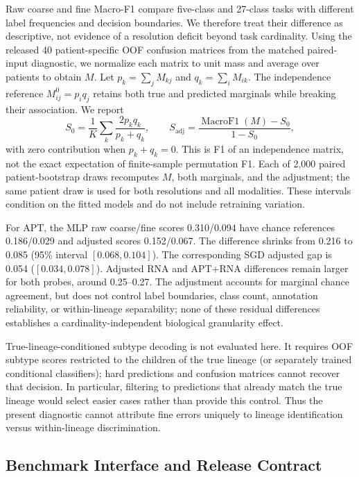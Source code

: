 \documentclass{article} %
\begin{document}
Raw coarse and fine Macro-F1 compare five-class and 27-class tasks with different
label frequencies and decision boundaries. We therefore treat their difference
as descriptive, not evidence of a resolution deficit beyond task cardinality.
Using the released 40 patient-specific OOF confusion matrices from the matched
paired-input diagnostic, we normalize each matrix to unit mass and average
over patients to obtain $M$. Let $p_k=\sum_j M_{kj}$ and
$q_k=\sum_i M_{ik}$. The independence reference $M^0_{ij}=p_iq_j$ retains both
true and predicted marginals while breaking their association. We report
\begin{equation}
S_0=\frac{1}{K}\sum_k\frac{2p_kq_k}{p_k+q_k},\qquad
S_{\mathrm{adj}}=\frac{\operatorname{MacroF1}(M)-S_0}{1-S_0},
\end{equation}
with zero contribution when $p_k+q_k=0$. This is F1 of an independence matrix,
not the exact expectation of finite-sample permutation F1. Each of 2,000 paired
patient-bootstrap draws recomputes $M$, both marginals, and the adjustment; the
same patient draw is used for both resolutions and all modalities. These
intervals condition on the fitted models and do not include retraining variation.



For APT, the MLP raw coarse/fine scores 0.310/0.094 have chance references
0.186/0.029 and adjusted scores 0.152/0.067. The difference shrinks from 0.216
to 0.085 (95\% interval $[0.068,0.104]$). The corresponding SGD adjusted gap
is 0.054 ($[0.034,0.078]$). Adjusted RNA and APT+RNA differences remain larger
for both probes, around 0.25--0.27. The adjustment accounts for marginal chance
agreement, but does not control label boundaries, class count, annotation
reliability, or within-lineage separability; none of these residual differences
establishes a cardinality-independent biological granularity effect.

True-lineage-conditioned subtype decoding is not evaluated here. It requires
OOF subtype scores restricted to the children of the true lineage (or separately
trained conditional classifiers); hard predictions and confusion matrices cannot
recover that decision. In particular, filtering to predictions that already
match the true lineage would select easier cases rather than provide this
control. Thus the present diagnostic cannot attribute fine errors uniquely to
lineage identification versus within-lineage discrimination.

\subsection{Benchmark Interface and Release Contract}
\label{sec:appendix:benchmark_release}
\end{document}
